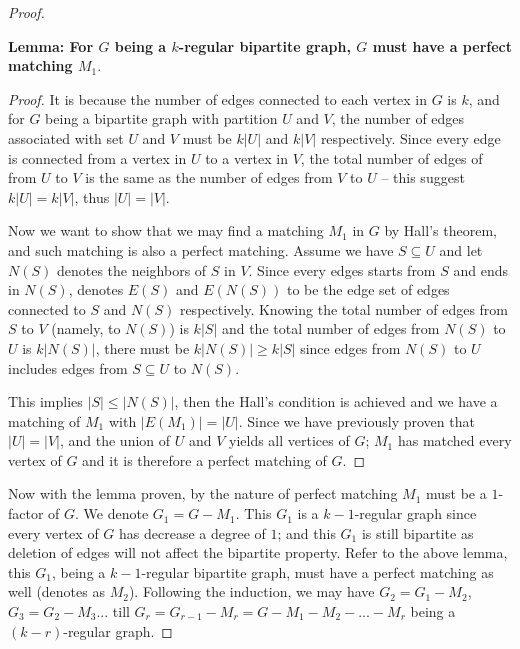 \documentclass[11pt]{article}
\begin{document}
\begin{proof}
    \leavevmode\newline


    \begin{adjustwidth}{1cm}{}

    \textbf{Lemma: For $G$ being a $k$-regular bipartite graph, $G$ must have a perfect matching $M_1$}.\newline

    \begin{proof}
        It is because the number of edges connected to each vertex in $G$ is $k$, and for $G$ being a bipartite graph with partition $U$ and $V$, the number of edges associated with set $U$ and $V$ must be $k|U|$ and $k|V|$ respectively. Since every edge is connected from a vertex in $U$ to a vertex in $V$, the total number of edges of from $U$ to $V$ is the same as the number of edges from $V$ to $U$ -- this suggest $k|U| = k|V|$, thus $|U| = |V|$.

        Now we want to show that we may find a matching $M_1$ in $G$ by Hall's theorem, and such matching is also a perfect matching. Assume we have $S \subseteq U$ and let $N(S)$ denotes the neighbors of $S$ in $V$. Since every edges starts from $S$ and ends in $N(S)$, denotes $E(S)$ and $E(N(S))$ to be the edge set of edges connected to $S$ and $N(S)$ respectively. Knowing the total number of edges from $S$ to $V$ (namely, to $N(S)$) is $k|S|$ and the total number of edges from $N(S)$ to $U$ is $k|N(S)|$, there must be $k|N(S)| \geq k|S|$ since edges from $N(S)$ to $U$ includes edges from $S \subseteq U$ to $N(S)$.

        This implies $|S| \leq |N(S)|$, then the Hall's condition is achieved and we have a matching of $M_1$ with $|E(M_1)| = |U|$. Since we have previously proven that $|U| = |V|$, and the union of $U$ and $V$ yields all vertices of $G$; $M_1$ has matched every vertex of $G$ and it is therefore a perfect matching of $G$.\newline
    \end{proof}
\end{adjustwidth}

Now with the lemma proven, by the nature of perfect matching $M_1$ must be a $1$-factor of $G$. We denote $G_1 = G - M_1$. This $G_1$ is a $k-1$-regular graph since every vertex of $G$ has decrease a degree of $1$; and this $G_1$ is still bipartite as deletion of edges will not affect the bipartite property. Refer to the above lemma, this $G_1$, being a $k-1$-regular bipartite graph, must have a perfect matching as well (denotes as $M_2$). Following the induction, we may have $G_2 = G_1 - M_2$, $G_3 = G_2 - M_3$... till $G_r = G_{r-1} - M_r = G - M_1 - M_2 - ... - M_r$ being a $(k-r)$-regular graph.\newline


\end{proof}
\end{document}

